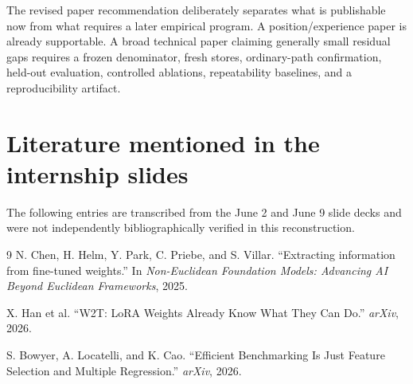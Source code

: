 \documentclass[11pt,oneside]{report}
\begin{document}
The revised paper recommendation deliberately separates what is publishable now from what requires a later empirical program. A position/experience paper is already supportable. A broad technical paper claiming generally small residual gaps requires a frozen denominator, fresh stores, ordinary-path confirmation, held-out evaluation, controlled ablations, repeatability baselines, and a reproducibility artifact.




\chapter{Literature mentioned in the internship slides}

The following entries are transcribed from the June 2 and June 9 slide decks and were not independently bibliographically verified in this reconstruction.

\begin{thebibliography}{9}
N. Chen, H. Helm, Y. Park, C. Priebe, and S. Villar.
``Extracting information from fine-tuned weights.''
In \emph{Non-Euclidean Foundation Models: Advancing AI Beyond Euclidean Frameworks}, 2025.

X. Han et al.
``W2T: LoRA Weights Already Know What They Can Do.''
\emph{arXiv}, 2026.

S. Bowyer, A. Locatelli, and K. Cao.
``Efficient Benchmarking Is Just Feature Selection and Multiple Regression.''
\emph{arXiv}, 2026.
\end{thebibliography}
\end{document}
